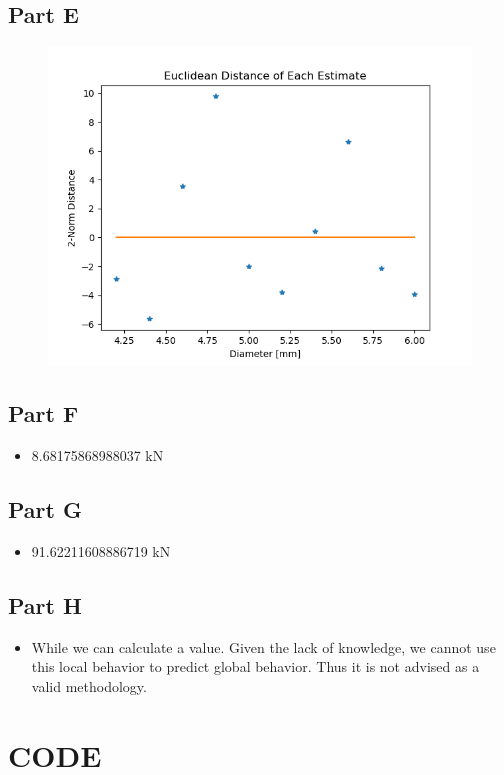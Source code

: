 \documentclass[]{report}
\begin{document}
	
	\subsection{Part E}
	
	\begin{figure}[h]
		\centering
		\includegraphics[width=0.7\linewidth]{pics/1e}
		\label{fig:1e}
	\end{figure}
	
	\subsection{Part F}
	
	\begin{itemize}
		\item  8.68175868988037 kN
	\end{itemize}
	
	\subsection{Part G}
	
	\begin{itemize}
		\item  91.62211608886719 kN
	\end{itemize}
	
	\subsection{Part H}
	
		\begin{itemize}
		\item While we can calculate a value.  Given the lack of knowledge, we cannot use this local behavior to predict global behavior. Thus it is not advised as a valid methodology.
	\end{itemize}
	\section{CODE}
	
\end{document}

